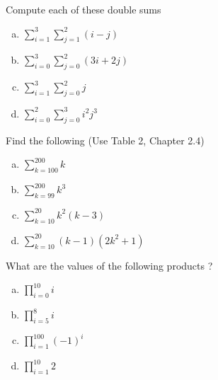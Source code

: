 \documentclass{article}
\newenvironment{problem}[2][Problem]{\begin{trivlist}
\item[\hskip \labelsep {\bfseries #1}\hskip \labelsep {\bfseries #2.}]}{\end{trivlist}}
\begin{document}
\begin{problem}{8}[Chapter 2.4, Question 34]
    Compute each of these double sums
    \begin{enumerate}[(a)]
        \item $\sum_{i=1}^{3} \sum_{j=1}^{2} (i-j)$
        \item $\sum_{i=0}^{3} \sum_{j=0}^{2} (3i+2j)$
        \item $\sum_{i=1}^{3} \sum_{j=0}^{2} j$
        \item $\sum_{i=0}^{2} \sum_{j=0}^{3} i^2 j^3$
    \end{enumerate}
    
\end{problem}

\begin{problem}{9}[Chapter 2.4, Question 39,40,41,42]
    Find the following (Use Table 2, Chapter 2.4)
    \begin{enumerate}[(a)]
        \item $\sum_{k=100}^{200} k $
        \item $\sum_{k=99}^{200} k^3$
        \item $\sum_{k=10}^{20} k^2(k-3)$
        \item $\sum_{k=10}^{20} (k-1)(2k^2+1)$
    \end{enumerate}
    
\end{problem}

\begin{problem}{10}[Chapter 2.4, Question 45]
What are the values of the following products ?
\begin{enumerate}[(a)]
    \item $\prod_{i=0}^{10} i $
    \item $\prod_{i=5}^{8} i $
    \item $\prod_{i=1}^{100} (-1)^i $
    \item $\prod_{i=1}^{10} 2 $
\end{enumerate}
    
\end{problem}
\end{document}
